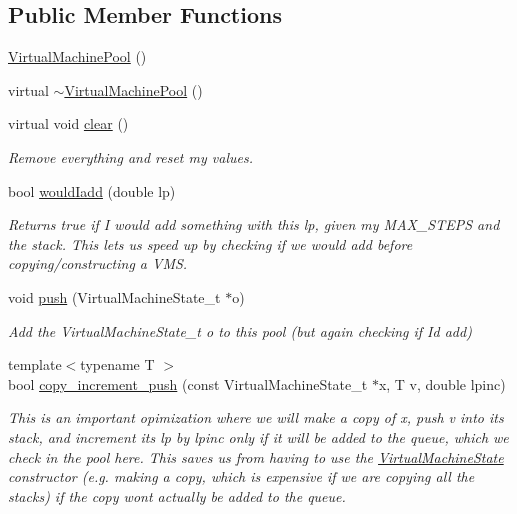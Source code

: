 \subsection*{Public Member Functions}
\begin{DoxyCompactItemize}
\item 
\hyperlink{class_virtual_machine_pool_a52af5e2bd83f9f218535bc731fbfafdf}{Virtual\+Machine\+Pool} ()
\item 
virtual \hyperlink{class_virtual_machine_pool_ad28e85800bad5642776730c33f97795f}{$\sim$\+Virtual\+Machine\+Pool} ()
\item 
virtual void \hyperlink{class_virtual_machine_pool_a1a514d25e69f45c8407f8d696861edd8}{clear} ()
\begin{DoxyCompactList}\small\item\em Remove everything and reset my values. \end{DoxyCompactList}\item 
bool \hyperlink{class_virtual_machine_pool_a903f749af76ea1e62222071a1e0a3034}{would\+Iadd} (double lp)
\begin{DoxyCompactList}\small\item\em Returns true if I would add something with this lp, given my M\+A\+X\+\_\+\+S\+T\+E\+PS and the stack. This lets us speed up by checking if we would add before copying/constructing a V\+MS. \end{DoxyCompactList}\item 
void \hyperlink{class_virtual_machine_pool_a9b164d9dc604f77825716e24323034a4}{push} (Virtual\+Machine\+State\+\_\+t $\ast$o)
\begin{DoxyCompactList}\small\item\em Add the Virtual\+Machine\+State\+\_\+t o to this pool (but again checking if I\textquotesingle{}d add) \end{DoxyCompactList}\item 
{\footnotesize template$<$typename T $>$ }\\bool \hyperlink{class_virtual_machine_pool_a4bf83ce58c80c72ae51c51a22a7d1e34}{copy\+\_\+increment\+\_\+push} (const Virtual\+Machine\+State\+\_\+t $\ast$x, T v, double lpinc)
\begin{DoxyCompactList}\small\item\em This is an important opimization where we will make a copy of x, push v into it\textquotesingle{}s stack, and increment its lp by lpinc only if it will be added to the queue, which we check in the pool here. This saves us from having to use the \hyperlink{class_virtual_machine_state}{Virtual\+Machine\+State} constructor (e.\+g. making a copy, which is expensive if we are copying all the stacks) if the copy won\textquotesingle{}t actually be added to the queue. \end{DoxyCompactList}\item 

\end{DoxyCompactItemize}
